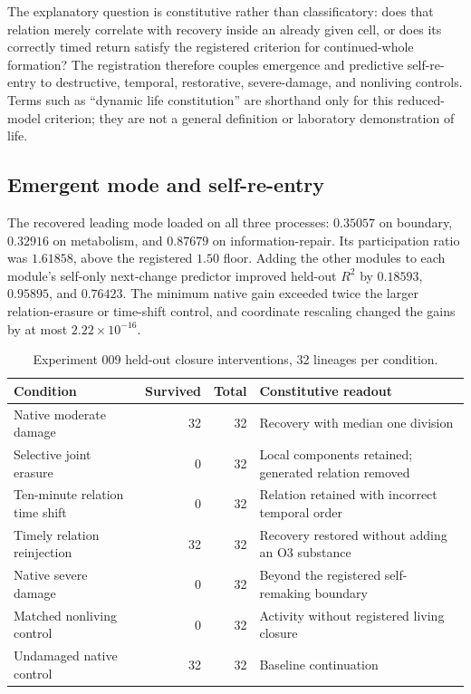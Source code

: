 \documentclass[11pt,a4paper]{article}
\begin{document}
The explanatory question is constitutive rather than classificatory: does that relation merely correlate with recovery inside an already given cell, or does its correctly timed return satisfy the registered criterion for continued-whole formation? The registration therefore couples emergence and predictive self-re-entry to destructive, temporal, restorative, severe-damage, and nonliving controls. Terms such as ``dynamic life constitution'' are shorthand only for this reduced-model criterion; they are not a general definition or laboratory demonstration of life.

\subsection{Emergent mode and self-re-entry}

The recovered leading mode loaded on all three processes: $0.35057$ on boundary, $0.32916$ on metabolism, and $0.87679$ on information-repair. Its participation ratio was $1.61858$, above the registered $1.50$ floor. Adding the other modules to each module's self-only next-change predictor improved held-out $R^2$ by $0.18593$, $0.95895$, and $0.76423$. The minimum native gain exceeded twice the larger relation-erasure or time-shift control, and coordinate rescaling changed the gains by at most $2.22\times10^{-16}$.

\begin{table}[H]
\centering
\footnotesize
\caption{Experiment 009 held-out closure interventions, 32 lineages per condition.}
\begin{tabularx}{\textwidth}{@{}>{\raggedright\arraybackslash}Xrr>{\raggedright\arraybackslash}p{5.0cm}@{}}
\toprule
Condition & Survived & Total & Constitutive readout \\
\midrule
Native moderate damage & 32 & 32 & Recovery with median one division \\
Selective joint erasure & 0 & 32 & Local components retained; generated relation removed \\
Ten-minute relation time shift & 0 & 32 & Relation retained with incorrect temporal order \\
Timely relation reinjection & 32 & 32 & Recovery restored without adding an O3 substance \\
Native severe damage & 0 & 32 & Beyond the registered self-remaking boundary \\
Matched nonliving control & 0 & 32 & Activity without registered living closure \\
Undamaged native control & 32 & 32 & Baseline continuation \\
\bottomrule
\end{tabularx}
\end{table}
\end{document}
